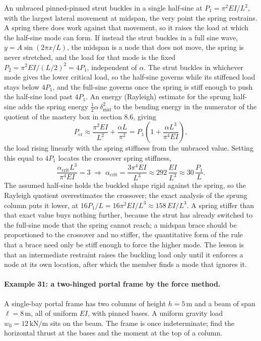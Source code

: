 An unbraced pinned-pinned strut buckles in a single half-sine at
$P_1 = \pi^2 EI/L^2$, with the largest lateral movement at midspan, the
very point the spring restrains. A spring there does work against that
movement, so it raises the load at which the half-sine mode can form. If
instead the strut buckles in a full sine wave, $y = A\sin(2\pi x/L)$, the
midspan is a node that does not move, the spring is never stretched, and
the load for that mode is the fixed $P_2 = \pi^2 EI/(L/2)^2 = 4 P_1$,
independent of $\alpha$. The strut buckles in whichever mode gives the
lower critical load, so the half-sine governs while its stiffened load
stays below $4 P_1$, and the full-sine governs once the spring is stiff
enough to push the half-sine load past $4 P_1$. An energy (Rayleigh)
estimate for the sprung half-sine adds the spring energy
$\tfrac12\alpha\,\delta_{\text{mid}}^2$ to the bending energy in the
numerator of the quotient of the mastery box in section 8.6, giving
\[
P_{\text{cr}} \approx \frac{\pi^2 EI}{L^2} + \frac{\alpha L}{\pi^2}
= P_1\left(1 + \frac{\alpha L^3}{\pi^4 EI}\right),
\]
the load rising linearly with the spring stiffness from the unbraced
value. Setting this equal to $4 P_1$ locates the crossover spring
stiffness,
\[
\frac{\alpha_{\text{crit}} L^3}{\pi^4 EI} = 3
\;\Rightarrow\;
\alpha_{\text{crit}} = \frac{3\pi^4 EI}{L^3} \approx 292\,\frac{EI}{L^3}
\approx 30\,\frac{P_1}{L}.
\]
The assumed half-sine holds the buckled shape rigid against the spring, so
the Rayleigh quotient overestimates the crossover; the exact analysis of
the sprung column puts it lower, at $16 P_1/L = 16\pi^2 EI/L^3 \approx
158\,EI/L^3$. A spring stiffer than that exact value buys nothing further,
because the strut has already switched to the full-sine mode that the
spring cannot reach; a midspan brace should be proportioned to the
crossover and no stiffer, the quantitative form of the rule that a brace
need only be stiff enough to force the higher mode. The lesson is that an intermediate
restraint raises the buckling load only until it enforces a node at its
own location, after which the member finds a mode that ignores it.

\paragraph{Example 31: a two-hinged portal frame by the force method.} A
single-bay portal frame has two columns of height $h = 5\,\si{\meter}$ and
a beam of span $\ell = 8\,\si{\meter}$, all of uniform $EI$, with pinned
bases. A uniform gravity load $w_0 = 12\,\text{kN}/\text{m}$ sits on the
beam. The frame is once indeterminate; find the horizontal thrust at the
bases and the moment at the top of a column.

